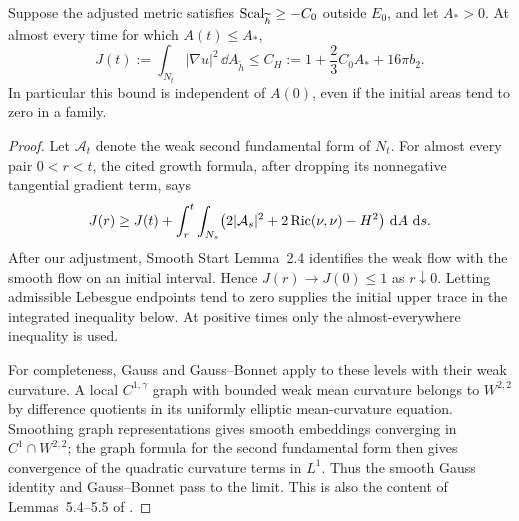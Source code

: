 \begin{lemma}\label{lem:flow-curvature}
Suppose the adjusted metric satisfies
$\operatorname{Scal}_{\widetilde h}\ge-C_0$ outside $E_0$, and let $A_*>0$.
At almost every time for which $A(t)\le A_*$,
\begin{equation}\label{eq:flow-uniform-curvature}
 J(t):=\int_{N_t}|\nabla u|^2\,\dd A_{\widetilde h}
 \le C_H:=1+\frac23 C_0 A_*+16\pi b_2.
\end{equation}
In particular this bound is independent of $A(0)$, even if the
initial areas tend to zero in a family.
\end{lemma}

\begin{proof}
Let $\mathcal A_t$ denote the weak second fundamental form of $N_t$.
For almost every pair $0<r<t$, the cited growth formula, after
dropping its nonnegative tangential gradient term, says
\begin{equation}\label{eq:flow-hi-growth}
 J(r)\ge J(t)+\int_r^t\int_{N_s}
 \bigl(2|\mathcal A_s|^2+2\operatorname{Ric}(\nu,\nu)-H^2\bigr)
 \,\mathop{}\!\mathrm d A\,\mathop{}\!\mathrm d s.
\end{equation}
After our adjustment, Smooth Start Lemma~2.4 identifies the weak
flow with the smooth flow on an initial interval.  Hence
$J(r)\to J(0)\le1$ as $r\downarrow0$.  Letting admissible
Lebesgue endpoints tend to zero supplies the initial upper trace in
the integrated inequality below.  At positive times only the
almost-everywhere inequality is used.

For completeness, Gauss and Gauss--Bonnet apply to these levels with
their weak curvature.  A local $C^{1,\gamma}$ graph with bounded weak
mean curvature belongs to $W^{2,2}$ by difference quotients in its
uniformly elliptic mean-curvature equation.  Smoothing graph
representations gives smooth embeddings converging in
$C^1\cap W^{2,2}$; the graph formula for the second fundamental form
then gives convergence of the quadratic curvature terms in $L^1$.
Thus the smooth Gauss identity and Gauss--Bonnet pass to the limit.
This is also the content of Lemmas~5.4--5.5 of
\citet{HI2001}.


\end{proof}

